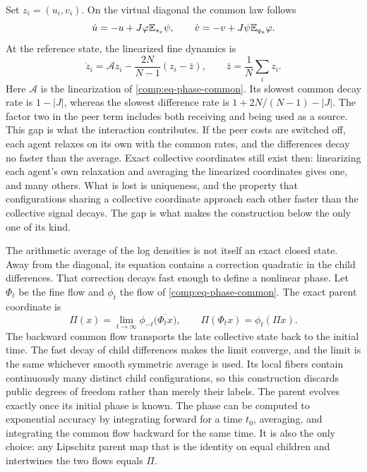 Set $z_i=(u_i,v_i)$. On the virtual diagonal the common law follows
\begin{equation}
 \dot u=-u+J\varphi\mathbb E_{s_v}\psi,\qquad
 \dot v=-v+J\psi\mathbb E_{q_u}\varphi.
 \label{comp:eq-phase-common}
\end{equation}
At the reference state, the linearized fine dynamics is
\begin{equation}
 \dot z_i=\mathcal A z_i-\frac{2N}{N-1}(z_i-\bar z),\qquad
 \bar z=\frac1N\sum_i z_i.
 \label{comp:eq-phase-rates}
\end{equation}
Here $\mathcal A$ is the linearization of \cref{comp:eq-phase-common}. Its slowest common decay rate is $1-|J|$, whereas the slowest difference rate is $1+2N/(N-1)-|J|$. The factor two in the peer term includes both receiving and being used as a source. This gap is what the interaction contributes. If the peer costs are switched off, each agent relaxes on its own with the common rates, and the differences decay no faster than the average. Exact collective coordinates still exist then: linearizing each agent's own relaxation and averaging the linearized coordinates gives one, and many others. What is lost is uniqueness, and the property that configurations sharing a collective coordinate approach each other faster than the collective signal decays. The gap is what makes the construction below the only one of its kind.

The arithmetic average of the log densities is not itself an exact closed state. Away from the diagonal, its equation contains a correction quadratic in the child differences. That correction decays fast enough to define a nonlinear phase. Let $\Phi_t$ be the fine flow and $\phi_t$ the flow of \cref{comp:eq-phase-common}. The exact parent coordinate is
\begin{equation}
 \Pi(x)=\lim_{t\to\infty}\phi_{-t}\bigl(\overline{\Phi_t x}\bigr),\qquad
 \Pi(\Phi_t x)=\phi_t(\Pi x).
 \label{comp:eq-phase-map}
\end{equation}
The backward common flow transports the late collective state back to the initial time. The fast decay of child differences makes the limit converge, and the limit is the same whichever smooth symmetric average is used. Its local fibers contain continuously many distinct child configurations, so this construction discards public degrees of freedom rather than merely their labels. The parent evolves exactly once its initial phase is known. The phase can be computed to exponential accuracy by integrating forward for a time $t_0$, averaging, and integrating the common flow backward for the same time. It is also the only choice: any Lipschitz parent map that is the identity on equal children and intertwines the two flows equals $\Pi$.

